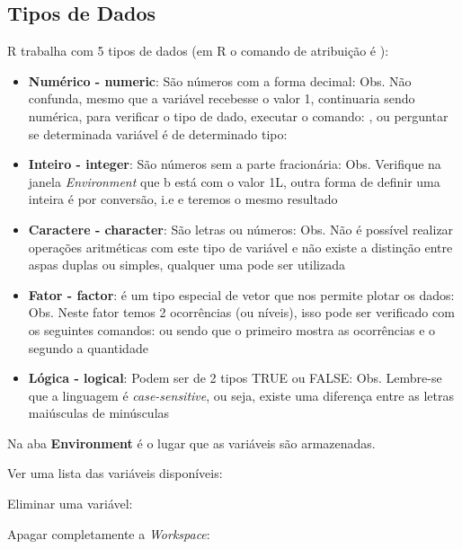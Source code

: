 \documentclass[a4paper,11pt]{article}
\begin{document}
\subsection{Tipos de Dados}
R trabalha com 5 tipos de dados (em R o comando de atribuição é \codigo{ <-}):
\begin{itemize}
  \item \textbf{Numérico - numeric}: São números com a forma decimal:  Obs. Não confunda, mesmo que a variável recebesse o valor 1, continuaria sendo numérica, para verificar o tipo de dado, executar o comando: , ou perguntar se determinada variável é de determinado tipo:  
  \item \textbf{Inteiro - integer}: São números sem a parte fracionária:  Obs. Verifique na janela \textit{Environment} que b está com o valor 1L, outra forma de definir uma inteira é por conversão, i.e  e teremos o mesmo resultado 
  \item \textbf{Caractere - character}: São letras ou números:  Obs. Não é possível realizar operações aritméticas com este tipo de variável e não existe a distinção entre aspas duplas ou simples, qualquer uma pode ser utilizada
  \item \textbf{Fator - factor}: é um tipo especial de vetor que nos permite plotar os dados:  Obs. Neste fator temos 2 ocorrências (ou níveis), isso pode ser verificado com os seguintes comandos:  ou  sendo que o primeiro mostra as ocorrências e o segundo a quantidade 
  \item \textbf{Lógica - logical}: Podem ser de 2 tipos TRUE ou FALSE:  Obs. Lembre-se que a linguagem é \textit{case-sensitive}, ou seja, existe uma diferença entre as letras maiúsculas de minúsculas
\end{itemize}

Na aba \textbf{Environment} é o lugar que as variáveis são armazenadas.

Ver uma lista das variáveis disponíveis: \\

Eliminar uma variável: \\

Apagar completamente a \textit{Workspace}: \\
\end{document}
